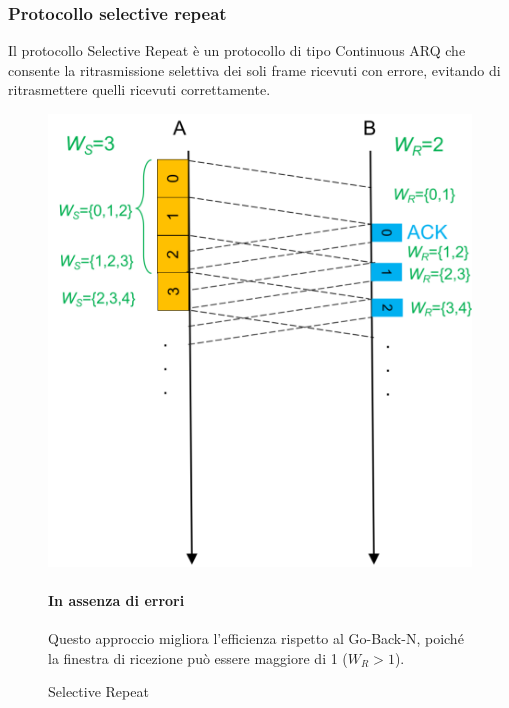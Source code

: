 \newpage

\subsubsection{Protocollo selective repeat} 
Il protocollo Selective Repeat è un protocollo di tipo Continuous ARQ che consente la ritrasmissione selettiva dei soli frame ricevuti con errore, evitando di ritrasmettere quelli ricevuti correttamente.


        \begin{figure}[htbp]
    \centering
    \begin{minipage}{0.47\textwidth}
        \includegraphics[width=\linewidth]{images/sr.png}
        \caption{Selective Repeat}
        
    \end{minipage}%
    \hfill
    \begin{minipage}{0.48\textwidth}
        \paragraph{In assenza di errori} Questo approccio migliora l'efficienza rispetto al Go-Back-N, poiché la finestra di ricezione può essere maggiore di 1 ($W_R > 1$).

    \end{minipage}
\end{figure}


